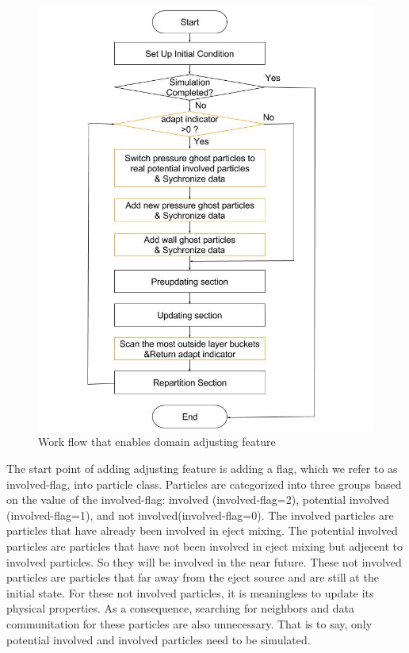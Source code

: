 \documentclass[conference,compsoc]{IEEEtran}
\begin{document}
\begin{figure}[!t]
\centering
\includegraphics[scale=0.33]{Work_flow_adjust}
\caption{Work flow that enables domain adjusting feature}
\label{fig:Work_flow_adjust}
\end{figure}
The start point of adding adjusting feature is adding a flag, which we refer to as involved-flag, into particle class. Particles are categorized into three groups based on the value of the involved-flag: involved (involved-flag=2), potential involved (involved-flag=1), and not involved(involved-flag=0). The involved particles are particles that have already been involved in eject mixing. The potential involved particles are particles that have not been involved in eject mixing but adjecent to involved particles. So they will be involved in the near future. These not involved particles are particles that far away from the eject source and are still at the initial state. For these not involved particles, it is meaningless to update its physical properties. As a consequence, searching for neighbors and data communitation for these particles are also unnecessary. That is to say, only potential involved and involved particles need to be simulated.
\end{document}
